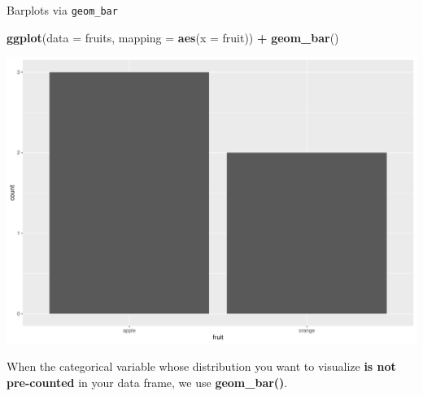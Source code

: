 \documentclass[
  ignorenonframetext,
]{beamer}
\newenvironment{Shaded}{\begin{snugshade}}{\end{snugshade}}
\newcommand{\AttributeTok}[1]{\textcolor[rgb]{0.13,0.29,0.53}{#1}}
\newcommand{\FunctionTok}[1]{\textcolor[rgb]{0.13,0.29,0.53}{\textbf{#1}}}
\newcommand{\NormalTok}[1]{#1}
\newcommand{\SpecialCharTok}[1]{\textcolor[rgb]{0.81,0.36,0.00}{\textbf{#1}}}
\begin{document}
\begin{frame}[fragile]{Barplots via \texttt{geom\_bar}}
\protect\hypertarget{barplots-via-geom_bar}{}
\tiny

\begin{Shaded}
\begin{Highlighting}[]
\FunctionTok{ggplot}\NormalTok{(}\AttributeTok{data =}\NormalTok{ fruits, }\AttributeTok{mapping =} \FunctionTok{aes}\NormalTok{(}\AttributeTok{x =}\NormalTok{ fruit)) }\SpecialCharTok{+}
  \FunctionTok{geom\_bar}\NormalTok{()}
\end{Highlighting}
\end{Shaded}

\begin{center}\includegraphics[width=0.9\linewidth,height=0.5\textheight]{Week2_Lect_files/figure-beamer/unnamed-chunk-38-1} \end{center}
\normalsize

When the categorical variable whose distribution you want to visualize
\textbf{is not pre-counted} in your data frame, we use
\textbf{geom\_bar()}.
\end{frame}
\end{document}
